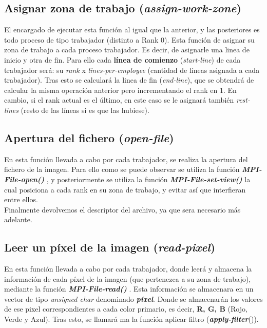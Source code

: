 \documentclass[11pt]{article}
\begin{document}
\subsection{Asignar zona de trabajo (\textit{assign-work-zone})}
El encargado de ejecutar esta función al igual que la anterior, y las posteriores es todo proceso de tipo trabajador (distinto a Rank 0). Esta función de asignar su zona de trabajo a cada proceso trabajador. Es decir, de asignarle una linea de inicio y otra de fin. Para ello cada \textbf{línea de comienzo} (\textit{start-line}) de cada trabajador será: su \textit{rank} x \textit{lines-per-employee} (cantidad de líneas asignada a cada trabajador). Tras esto se calculará la linea de fin (\textit{end-line}), que se obtendrá de calcular la misma operación anterior pero incrementando el rank en 1. En cambio, si el rank actual es el último, en este caso se le asignará también \textit{rest-lines} (resto de las líneas si es que las hubiese).



\subsection{Apertura del fichero (\textit{open-file})}
En esta función llevada a cabo por cada trabajador, se realiza la apertura del fichero de la imagen. Para ello como se puede observar se utiliza la función \textit{\textbf{MPI-File-open()}} \cite{org}, y posteriormente se utiliza la función \textbf{\textit{MPI-File-set-view()}} \cite{org} la cual posiciona a cada rank en su zona de trabajo, y evitar así que interfieran entre ellos.\\
Finalmente devolvemos el descriptor del archivo, ya que sera necesario más adelante. 



\subsection{Leer un píxel de la imagen (\textit{read-pixel})}
En esta función llevada a cabo por cada trabajador, donde leerá y almacena la información de cada píxel de la imagen (que pertenezca a su zona de trabajo), mediante la función \textit{\textbf{MPI-File-read()}} \cite{org}. Esta información se almacenara en un vector de tipo \textit{unsigned char} denominado \textit{\textbf{píxel}}. Donde se almacenarán los valores de ese pixel correspondientes a cada color primario, es decir, \textbf{R, G, B} (Rojo, Verde y Azul).
Tras esto, se llamará ma la función aplicar filtro (\textbf{\textit{apply-filter}}()).

\end{document}
